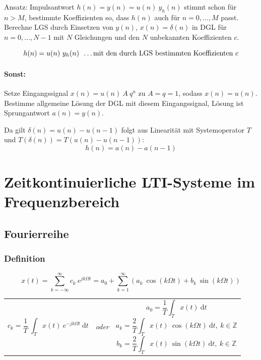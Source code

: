 \documentclass[10pt,a4paper]{article}
\newcommand{\fancythumb}[2]{
	\addthumb{#1}{\large\sffamily\textbf{\space\space#1\vspace{5pt}}}{white}{#2}
}
\begin{document}
\vspace{.5em}
Ansatz: Impulsantwort $h(n) = y(n) = u(n) ~ y_h(n)$ stimmt schon für $n > M$, bestimmte Koeffizienten so, dass $h(n)$ auch für $n = 0, …, M$ passt. Berechne LGS durch Einsetzen von $y(n)$, $x(n) = \delta(n)$ in DGL für $n = 0, …, N - 1$ mit $N$ Gleichungen und den $N$ unbekannten Koeffizienten $c$.

\[
	h(n) = u(n) ~ y_h(n) ~~ \textnormal{…mit den durch LGS bestimmten Koeffizienten $c$}
\]

\paragraph{Sonst:} Setze Eingangssignal $x(n) = u(n) ~ A ~ q^n$ zu $A = q = 1$, sodass $x(n) = u(n)$. Bestimme allgemeine Lösung der DGL mit diesem Eingangssignal, Lösung ist Sprungantwort $a(n) = y(n)$.

\vspace{.5em}
Da gilt $\delta(n) = u(n) - u(n - 1)$ folgt aus Linearität mit Systemoperator $T$ und $T(\delta(n)) = T(u(n) - u(n - 1))$:
\[
	h(n) = a(n) - a(n-1)
\]

\newpage


\section*{Zeitkontinuierliche LTI-Systeme im Frequenzbereich}
\fancythumb{ZK-f}{blue}
\subsection*{Fourierreihe}
\subsubsection*{Definition}
\[
	x(t) = \sum_{k=-\infty}^\infty c_k ~ e^{jk\Omega t} = a_0 + \sum_{k=1}^\infty \left( a_k ~ \cos(k \Omega t) + b_k ~ \sin(k \Omega t) \right)
\]

\begin{centering}
\begin{tabular}{ >{\centering\arraybackslash} m{7cm} >{\centering\arraybackslash} m{1cm} >{\centering\arraybackslash} m{7cm} }

\[
	c_k = \frac{1}{T} ~ \int_T x(t) ~ e^{-jk\Omega t} ~ \mathrm dt
\] & \textit{\sffamily oder} & {
\[
	a_0 = \frac{1}{T} \int_T x(t) ~ \mathrm dt
\]
\[
	a_k = \frac{2}{T} \int_T x(t) ~ \cos(k\Omega t) ~ \mathrm dt, ~ k \in \mathbb Z
\]
\[
	b_k = \frac{2}{T} \int_T x(t) ~ \sin(k\Omega t) ~ \mathrm dt, ~ k \in \mathbb Z
\]
}\\
\end{tabular}
\end{centering}
\end{document}
